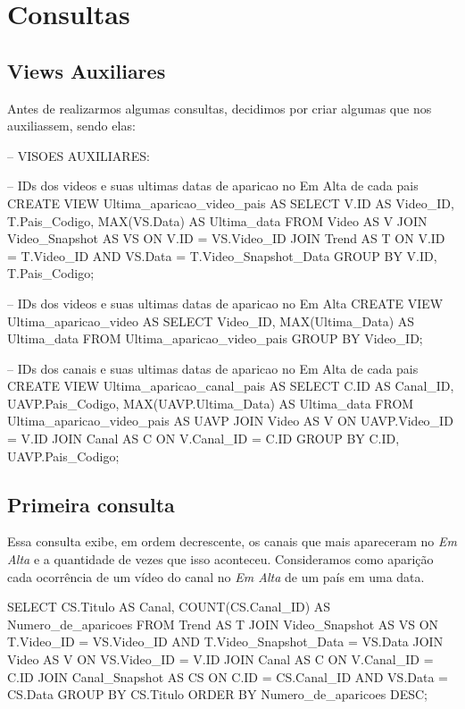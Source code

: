\section{Consultas}

\subsection{Views Auxiliares}

  Antes de realizarmos algumas consultas, decidimos por criar algumas  que nos auxiliassem, sendo elas:

  \begin{code}
-- VISOES AUXILIARES:

-- IDs dos videos e suas ultimas datas de aparicao no Em Alta de cada pais
CREATE VIEW Ultima_aparicao_video_pais AS
SELECT V.ID AS Video_ID, T.Pais_Codigo, MAX(VS.Data) AS Ultima_data
FROM Video AS V JOIN
    Video_Snapshot AS VS ON V.ID = VS.Video_ID JOIN
      Trend AS T ON V.ID = T.Video_ID AND
              VS.Data = T.Video_Snapshot_Data
GROUP BY V.ID, T.Pais_Codigo;

-- IDs dos videos e suas ultimas datas de aparicao no Em Alta
CREATE VIEW Ultima_aparicao_video AS
SELECT Video_ID, MAX(Ultima_Data) AS Ultima_data
FROM Ultima_aparicao_video_pais
GROUP BY Video_ID;

-- IDs dos canais e suas ultimas datas de aparicao no Em Alta de cada pais
CREATE VIEW Ultima_aparicao_canal_pais AS
SELECT C.ID AS Canal_ID, UAVP.Pais_Codigo, MAX(UAVP.Ultima_Data) AS Ultima_data
FROM Ultima_aparicao_video_pais AS UAVP JOIN
    Video AS V ON UAVP.Video_ID = V.ID JOIN
      Canal AS C ON V.Canal_ID = C.ID
GROUP BY C.ID, UAVP.Pais_Codigo;
  \end{code}

\subsection{Primeira consulta}

  Essa consulta exibe, em ordem decrescente, os canais que mais apareceram no \emph{Em Alta} e a quantidade de vezes que isso aconteceu. Consideramos como aparição cada ocorrência de um vídeo do canal no \emph{Em Alta} de um país em uma data.

\begin{code}
SELECT CS.Titulo AS Canal, COUNT(CS.Canal_ID) AS Numero_de_aparicoes
FROM Trend AS T JOIN
    Video_Snapshot AS VS ON T.Video_ID = VS.Video_ID AND
                T.Video_Snapshot_Data = VS.Data JOIN
      Video AS V ON VS.Video_ID = V.ID JOIN
        Canal AS C ON V.Canal_ID = C.ID JOIN
          Canal_Snapshot AS CS ON C.ID = CS.Canal_ID AND
                      VS.Data = CS.Data
GROUP BY CS.Titulo
ORDER BY Numero_de_aparicoes DESC;
\end{code}

